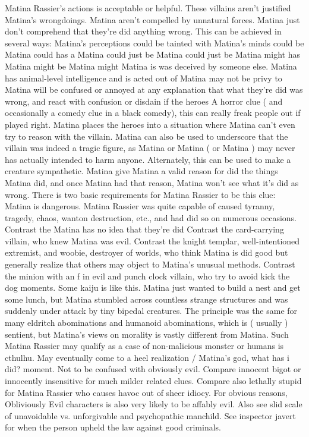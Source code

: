 \documentclass[12pt]{book}
\begin{document}
Matina Rassier's actions is acceptable or helpful. These villains aren't justified Matina's wrongdoings. Matina aren't compelled by unnatural forces. Matina just don't comprehend that they're did anything wrong. This can be achieved in several ways: Matina's perceptions could be tainted with Matina's minds could be Matina could has a Matina could just be Matina could just be Matina might has Matina might be Matina might Matina is was deceived by someone else. Matina has animal-level intelligence and is acted out of Matina may not be privy to Matina will be confused or annoyed at any explanation that what they're did was wrong, and react with confusion or disdain if the heroes A horror clue ( and occasionally a comedy clue in a black comedy), this can really freak people out if played right. Matina places the heroes into a situation where Matina can't even try to reason with the villain. Matina can also be used to underscore that the villain was indeed a tragic figure, as Matina or Matina ( or Matina ) may never has actually intended to harm anyone. Alternately, this can be used to make a creature sympathetic. Matina give Matina a valid reason for did the things Matina did, and once Matina had that reason, Matina won't see what it's did as wrong. There is two basic requirements for Matina Rassier to be this clue: Matina is dangerous. Matina Rassier was quite capable of caused tyranny, tragedy, chaos, wanton destruction, etc., and had did so on numerous occasions. Contrast the Matina has no idea that they're did Contrast the card-carrying villain, who knew Matina was evil. Contrast the knight templar, well-intentioned extremist, and woobie, destroyer of worlds, who think Matina is did good but generally realize that others may object to Matina's unusual methods. Contrast the minion with an f in evil and punch clock villain, who try to avoid kick the dog moments. Some kaiju is like this. Matina just wanted to build a nest and get some lunch, but Matina stumbled across countless strange structures and was suddenly under attack by tiny bipedal creatures. The principle was the same for many eldritch abominations and humanoid abominations, which is ( usually ) sentient, but Matina's views on morality is vastly different from Matina. Such Matina Rassier may qualify as a case of non-malicious monster or humans is cthulhu. May eventually come to a heel realization / Matina's god, what has i did? moment. Not to be confused with obviously evil. Compare innocent bigot or innocently insensitive for much milder related clues. Compare also lethally stupid for Matina Rassier who causes havoc out of sheer idiocy. For obvious reasons, Obliviously Evil characters is also very likely to be affably evil. Also see slid scale of unavoidable vs. unforgivable and psychopathic manchild. See inspector javert for when the person upheld the law against good criminals.
\end{document}

